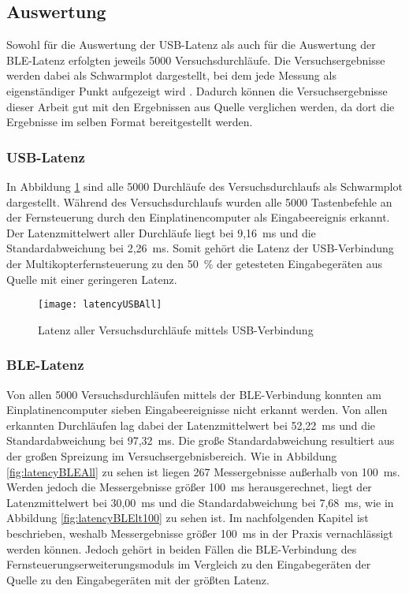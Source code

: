 \subsection{Auswertung}
Sowohl für die Auswertung der USB-Latenz als auch für die Auswertung der \ac{BLE}-Latenz erfolgten jeweils 5000 Versuchsdurchläufe. Die Versuchsergebnisse werden dabei als Schwarmplot dargestellt, bei dem jede Messung als eigenständiger Punkt aufgezeigt wird \cite[S.~7]{wimmerLatenzStation}. Dadurch können die Versuchsergebnisse dieser Arbeit gut mit den Ergebnissen aus Quelle \cite{wimmerLatenzStation} verglichen werden, da dort die Ergebnisse im selben Format bereitgestellt werden. 

\subsubsection{USB-Latenz}
In Abbildung \ref{fig:latencyUSBAll} sind alle 5000 Durchläufe des Versuchsdurchlaufs als Schwarmplot dargestellt. Während des Versuchsdurchlaufs wurden alle 5000 Tastenbefehle an der Fernsteuerung durch den Einplatinencomputer als Eingabeereignis erkannt. Der Latenzmittelwert aller Durchläufe liegt bei 9,16~ms und die Standardabweichung bei 2,26~ms. Somit gehört die Latenz der USB-Verbindung der Multikopterfernsteuerung zu den 50~\% der getesteten Eingabegeräten aus Quelle \cite{wimmerLatenzStation} mit einer geringeren Latenz.

\begin{figure}[H]
    \centering
    \texttt{[image: latencyUSBAll]}
    \caption{Latenz aller Versuchsdurchläufe mittels USB-Verbindung}
    \label{fig:latencyUSBAll}
\end{figure}

\subsubsection{\ac{BLE}-Latenz}
Von allen 5000 Versuchsdurchläufen mittels der \ac{BLE}-Verbindung konnten am Einplatinencomputer sieben Eingabeereignisse nicht erkannt werden. Von allen erkannten Durchläufen lag dabei der Latenzmittelwert bei 52,22~ms und die Standardabweichung bei 97,32~ms. Die große Standardabweichung resultiert aus der großen Spreizung im Versuchsergebnisbereich. Wie in Abbildung \ref{fig:latencyBLEAll} zu sehen ist liegen 267 Messergebnisse außerhalb von 100~ms. Werden jedoch die Messergebnisse größer 100~ms herausgerechnet, liegt der Latenzmittelwert bei 30,00~ms und die Standardabweichung bei 7,68~ms, wie in Abbildung \ref{fig:latencyBLElt100} zu sehen ist. Im nachfolgenden Kapitel ist beschrieben, weshalb Messergebnisse größer 100~ms in der Praxis vernachlässigt werden können. Jedoch gehört in beiden Fällen die \ac{BLE}-Verbindung des Fernsteuerungserweiterungsmoduls im Vergleich zu den Eingabegeräten der Quelle \cite{wimmerLatenzStation} zu den Eingabegeräten mit der größten Latenz.

